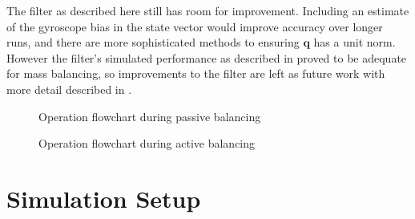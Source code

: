 The filter as described here still has room for improvement. Including an estimate of the gyroscope bias in the state vector would improve accuracy over longer runs, and there are more sophisticated methods to ensuring $\bm{q}$ has a unit norm. However the filter's simulated performance as described in  proved to be adequate for mass balancing, so improvements to the filter are left as future work with more detail described in .

\begin{figure}
    \centering
    
    \caption{Operation flowchart during passive balancing}
    \label{fig:sys_arch_passive}
\end{figure}

\begin{figure}
    \centering
    
    \caption{Operation flowchart during active balancing}
    \label{fig:sys_arch_active}
\end{figure}



\section{Simulation Setup}\label{sec:sim_setup}